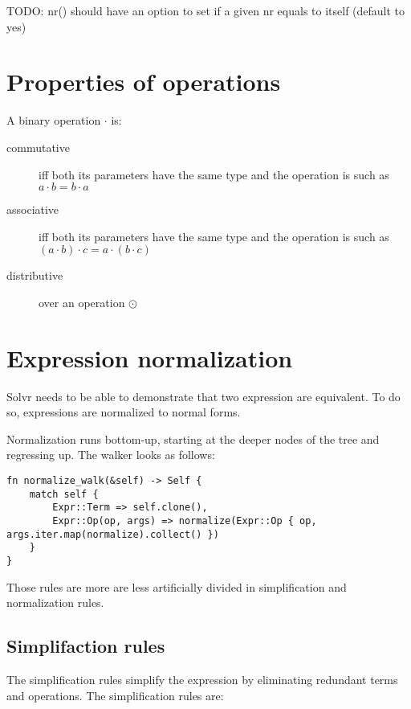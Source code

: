 \documentclass[11pt]{article}
\begin{document}
TODO: nr() should have an option to set if a given nr equals to
itself (default to yes)

\section{Properties of operations}

A binary operation $\cdot$ is:

\begin{description}
\item[commutative] iff both its parameters have the same type and the
  operation is such as $a\cdot b = b\cdot a$
\item[associative] iff both its parameters have the same type and the
  operation is such as $(a \cdot b) \cdot c = a \cdot (b \cdot c)$
\item[distributive] over an operation $\odot$



\end{description}
\section{Expression normalization}

Solvr needs to be able to demonstrate that two expression are
equivalent.  To do so, expressions are normalized to normal forms.

Normalization runs bottom-up, starting at the deeper nodes of the tree
and regressing up.  The walker looks as follows:

\begin{verbatim}
fn normalize_walk(&self) -> Self {
    match self {
        Expr::Term => self.clone(),
        Expr::Op(op, args) => normalize(Expr::Op { op, args.iter.map(normalize).collect() })
    }
}
\end{verbatim}

Those rules are more are less artificially divided in simplification
and normalization rules.

\subsection{Simplifaction rules}

The simplification rules simplify the expression by eliminating
redundant terms and operations.  The simplification rules are:
\end{document}
